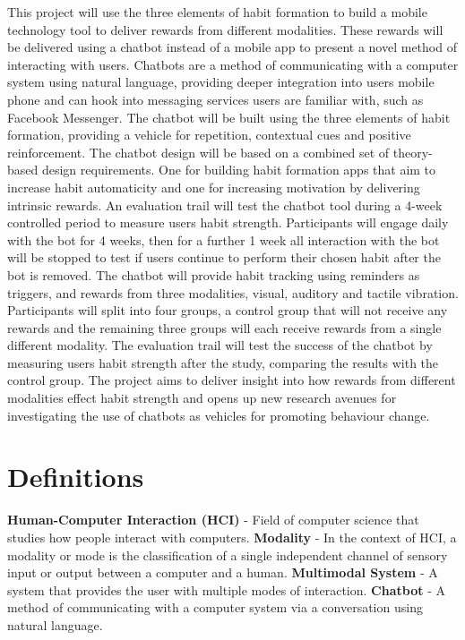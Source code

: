 \newline
This project will use the three elements of habit formation to build a mobile technology tool to deliver rewards from different modalities. These rewards will be delivered using a chatbot instead of a mobile app to present a novel method of interacting with users. Chatbots are a method of communicating with a computer system using natural language, providing deeper integration into users mobile phone and can hook into messaging services users are familiar with, such as Facebook Messenger. The chatbot will be built using the three elements of habit formation, providing a vehicle for repetition, contextual cues and positive reinforcement. The chatbot design will be based on a combined set of theory-based design requirements. One for building habit formation apps that aim to increase habit automaticity and one for increasing motivation by delivering intrinsic rewards.\newline
\newline
An evaluation trail will test the chatbot tool during a 4-week controlled period to measure users habit strength. Participants will engage daily with the bot for 4 weeks, then for a further 1 week all interaction with the bot will be stopped to test if users continue to perform their chosen habit after the bot is removed. The chatbot will provide habit tracking using reminders as triggers, and rewards from three modalities, visual, auditory and tactile vibration. Participants will split into four groups, a control group that will not receive any rewards and the remaining three groups will each receive rewards from a single different modality. The evaluation trail will test the success of the chatbot by measuring users habit strength after the study, comparing the results with the control group.\newline
\newline
The project aims to deliver insight into how rewards from different modalities effect habit strength and opens up new research avenues for investigating the use of chatbots as vehicles for promoting behaviour change.
\newpage

\section*{Definitions}

\textbf{Human-Computer Interaction (HCI)} - Field of computer science that studies how people interact with computers.\newline
\newline
\textbf{Modality} - In the context of HCI, a modality or mode is the classification of a single independent channel of sensory input or output between a computer and a human.\newline
\newline
\textbf{Multimodal System} - A system that provides the user with multiple modes of interaction.\newline
\newline
\textbf{Chatbot} - A method of communicating with a computer system via a conversation using natural language.

\newpage
